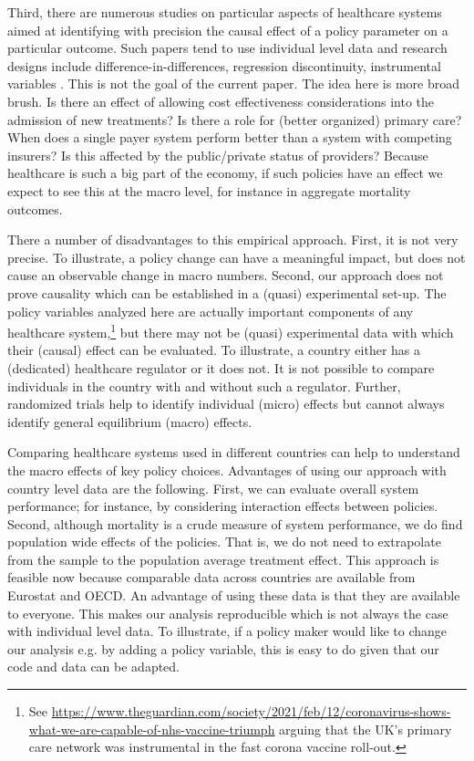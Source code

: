 \documentclass[12pt,english,a4paper]{article}
\begin{document}
Third, there are numerous studies on particular aspects of healthcare systems aimed at identifying with precision the causal effect of a policy parameter on a particular outcome. Such papers tend to use individual level data and research designs include difference-in-differences, regression discontinuity, instrumental variables \citep{econometricevaluation}. This is not the goal of the current paper. The idea here is more broad brush. Is there an effect of allowing cost effectiveness considerations into the admission of new treatments? Is there a role for (better organized) primary care? When does a single payer system perform better than a system with competing insurers? Is this affected by the public/private status of providers? Because healthcare is such a big part of the economy, if such policies have an effect we expect to see this at the macro level, for instance in aggregate mortality outcomes. 

There a number of disadvantages to this empirical approach. First, it is not very precise. To illustrate, a policy change can have a meaningful impact, but does not cause an observable change in macro numbers. Second, our approach does not prove causality which can be established in a (quasi) experimental set-up. The policy variables analyzed here are actually important components of any healthcare system,\footnote{See \url{https://www.theguardian.com/society/2021/feb/12/coronavirus-shows-what-we-are-capable-of-nhs-vaccine-triumph} arguing that the UK's primary care network was instrumental in the fast corona vaccine roll-out.} but there may not be (quasi) experimental data with which their (causal) effect can be evaluated. To illustrate, a country either has a (dedicated) healthcare regulator or it does not. It is not possible to compare individuals in the country with and without such a regulator. Further, randomized trials help to identify individual (micro) effects but cannot always identify general equilibrium (macro) effects.

Comparing healthcare systems used in different countries can help to understand the macro effects of key policy choices. Advantages of using our approach with country level data are the following. First, we can evaluate overall system performance; for instance, by considering interaction effects between policies. Second, although mortality is a crude measure of system performance, we do find population wide effects of the policies. That is, we do not need to extrapolate from the sample to the population average treatment effect. This approach is feasible now because comparable data across countries are available from Eurostat and OECD. An advantage of using these data is that they are available to everyone. This makes our analysis reproducible which is not always the case with individual level data. To illustrate, if a policy maker would like to change our analysis e.g. by adding a policy variable, this is easy to do given that our code and data can be adapted.
\end{document}
